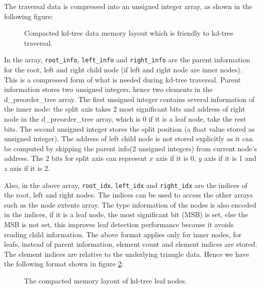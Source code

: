 The traversal data is compressed into an unsigned integer array, as shown in the following figure:

\begin{figure}[htp]
    \centering
    \renewcommand{\thefigure}{\thechapter.\arabic{figure}}
    \caption[Compacted memory layout of constructed kd-tree data]{Compacted kd-tree data memory layout which is friendly to kd-tree traversal.}
    \label{fig:kdtree_data_memory_layout}
\end{figure}

In the array, {\tt root\_info}, {\tt left\_info} and {\tt right\_info} are the parent information for the root, left and right child node (if left and right node are inner nodes). This is a compressed form of what is needed during kd-tree traversal. Parent information stores two unsigned integers, hence two elements in the d\_preorder\_tree array. The first unsigned integer contains several information of the inner node: the split axis takes 2 most significant bits and address of right node in the d\_preorder\_tree array, which is 0 if it is a leaf node, take the rest bits. The second unsigned integer stores the split position (a float value stored as unsigned integer). The address of left child node is not stored explicitly as it can be computed by skipping the parent info(2 unsigned integers) from current node's address. The 2 bits for split axis can represent \(x\) axis if it is 0, \(y\) axis if it is 1 and \(z\) axis if it is 2.

Also, in the above array, {\tt root\_idx}, {\tt left\_idx} and {\tt right\_idx} are the indices of the root, left and right nodes. The indices can be used to access the other arrays such as the node extents array. The type information of the nodes is also encoded in the indices, if it is a leaf node, the most significant bit (MSB) is set, else the MSB is not set, this improves leaf detection performance because it avoids reading child information. The above format applies only for inner nodes, for leafs, instead of parent information, element count and element indices are stored. The element indices are relative to the underlying triangle data. Hence we have the following format shown in figure \ref{fig:kdtree_leaf_memory_layout}:

\begin{figure}[htp]
    \centering
    \renewcommand{\thefigure}{\thechapter.\arabic{figure}}
    \caption[Compacted memory layout of kd-tree leaf nodes]{The compacted memory layout of kd-tree leaf nodes.}
    \label{fig:kdtree_leaf_memory_layout}
\end{figure}

